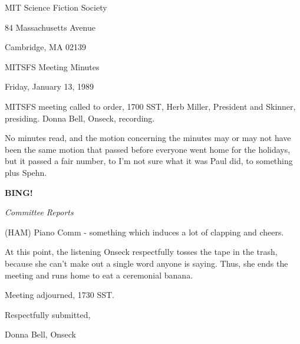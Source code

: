 \documentclass[12pt]{article}
\newcommand{\bing}{{\bf BING!} }
\newcommand{\goto}[1]{\bing \vskip 12pt \centerline{{\em{#1}}}}
\begin{document}
\begin{center}

MIT Science Fiction Society 

84 Massachusetts Avenue

Cambridge, MA 02139

\vspace{12pt}

MITSFS Meeting Minutes 

Friday, January 13, 1989

\end{center}
 
\vspace{18pt}

\setlength{\parskip}{6pt}

\noindent
MITSFS meeting called to order, 1700 SST, Herb Miller, President and Skinner, presiding. Donna Bell, Onseck, recording.

No minutes read, and the motion concerning the minutes may or may not have been the same motion that passed before everyone went home for the holidays, but it passed a fair number, to I'm not sure what it was Paul did, to something plus Spehn.

\goto{Committee Reports}
(HAM) Piano Comm - something which induces a lot of clapping and cheers.

At this point, the listening Onseck respectfully tosses the tape in the trash, because she can't make out a single word anyone is saying. Thus, she ends the meeting and runs home to eat a ceremonial banana.

\vspace{12pt}

\noindent
Meeting adjourned, 1730 SST.

\vspace{18pt}

\centerline{Respectfully submitted,}
\centerline{Donna Bell, Onseck}
\end{document}

